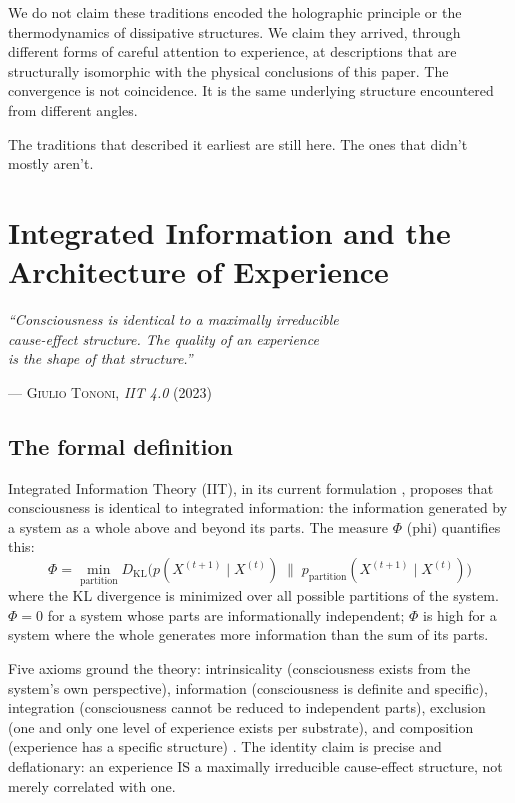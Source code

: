 \documentclass[12pt, a4paper]{article}
\newcommand{\KL}{D_{\mathrm{KL}}}
\newcommand{\phiIIT}{\Phi}
\begin{document}
We do not claim these traditions encoded the holographic principle or the thermodynamics of
dissipative structures. We claim they arrived, through different forms of careful attention
to experience, at descriptions that are structurally isomorphic with the physical conclusions
of this paper. The convergence is not coincidence. It is the same underlying structure
encountered from different angles.

The traditions that described it earliest are still here. The ones that didn't mostly
aren't.

\section{Integrated Information and the Architecture of Experience}

\epigraph{
  \textit{``Consciousness is identical to a maximally irreducible\\
  cause-effect structure. The quality of an experience\\
  is the shape of that structure.''}
}{--- \textsc{Giulio Tononi,} \textit{IIT 4.0} (2023)}

\subsection{The formal definition}

Integrated Information Theory (IIT), in its current formulation \citep{albantakis2023},
proposes that consciousness is identical to integrated information: the information generated
by a system as a whole above and beyond its parts. The measure $\phiIIT$ (phi) quantifies this:
\[
\phiIIT = \min_{\text{partition}} \KL\!\bigl(p(X^{(t+1)} \mid X^{(t)}) \;\|\;
p_{\text{partition}}(X^{(t+1)} \mid X^{(t)})\bigr)
\]
where the KL divergence is minimized over all possible partitions of the system. $\phiIIT = 0$
for a system whose parts are informationally independent; $\phiIIT$ is high for a system where
the whole generates more information than the sum of its parts.

Five axioms ground the theory: intrinsicality (consciousness exists from the system's own
perspective), information (consciousness is definite and specific), integration (consciousness
cannot be reduced to independent parts), exclusion (one and only one level of experience
exists per substrate), and composition (experience has a specific structure)
\citep{tononi2016}. The identity claim is precise and deflationary: an experience IS a
maximally irreducible cause-effect structure, not merely correlated with one.
\end{document}
